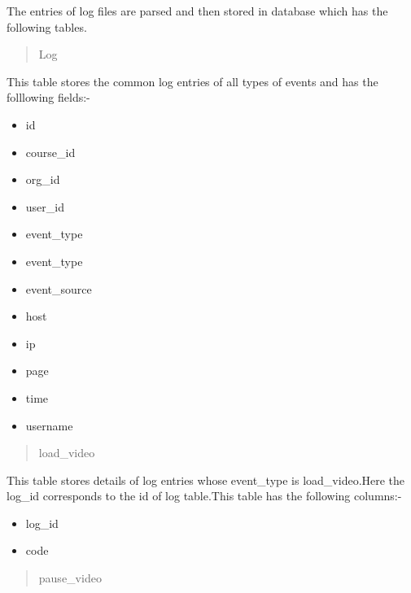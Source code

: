 \documentclass[a4paper,12pt,oneside]{sphinxmanual}
\begin{document}
The entries of log files are parsed and then stored in database which has the following tables.
\begin{quote}\begin{description}
\item[{Log}] \leavevmode
\end{description}\end{quote}

\begin{DUlineblock}{0em}
\item[] This table stores the common log entries of all types of events and has the  folllowing fields:-
\end{DUlineblock}
\begin{itemize}
\item {} 
id

\item {} 
course\_id

\item {} 
org\_id

\item {} 
user\_id

\item {} 
event\_type

\item {} 
event\_type

\item {} 
event\_source

\item {} 
host

\item {} 
ip

\item {} 
page

\item {} 
time

\item {} 
username

\end{itemize}
\begin{quote}\begin{description}
\item[{load\_video}] \leavevmode
\end{description}\end{quote}

\begin{DUlineblock}{0em}
\item[] This table stores details of log entries whose event\_type is load\_video.Here the log\_id corresponds to the id of log table.This table has   the following columns:-
\end{DUlineblock}
\begin{itemize}
\item {} 
log\_id

\item {} 
code

\end{itemize}
\begin{quote}\begin{description}
\item[{pause\_video}] \leavevmode
\end{description}\end{quote}
\end{document}
